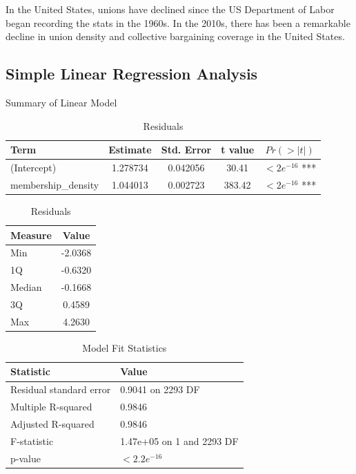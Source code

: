 \documentclass[11pt]{article}\usepackage[]{graphicx}\usepackage[]{xcolor}
\begin{document}
In the United States, unions have declined since the US Department of Labor began recording the stats in the 1960s. In the 2010s, there has been a remarkable decline in union density and collective bargaining coverage in the United States.

\subsection{Simple Linear Regression Analysis}
\begin{table}[ht]
\centering
\begin{minipage}[b]{0.48\linewidth}
\centering
\caption{Summary of Linear Model}
\begin{tabular}{@{}lcccc@{}}
\toprule
Term                & Estimate  & Std. Error & t value & $Pr(>|t|)$      \\ 
\midrule
(Intercept)         & 1.278734  & 0.042056   & 30.41   & $<2e^{-16}$ *** \\
membership\_density & 1.044013  & 0.002723   & 383.42  & $<2e^{-16}$ *** \\
\bottomrule
\end{tabular}
\label{tab:modelsummary}
\end{minipage}\hfill
\begin{minipage}[b]{0.48\linewidth}
\centering
\caption{Residuals}
\begin{tabular}{@{}lc@{}}
\toprule
Measure & Value      \\ 
\midrule
Min     & -2.0368    \\
1Q      & -0.6320    \\
Median  & -0.1668    \\
3Q      & 0.4589     \\
Max     & 4.2630     \\
\bottomrule
\end{tabular}
\label{tab:residuals}
\end{minipage}
\end{table}

\begin{table}[ht]
\centering
\caption{Model Fit Statistics}
\begin{tabular}{@{}ll@{}}
\toprule
Statistic                       & Value           \\
\midrule
Residual standard error         & 0.9041 on 2293 DF \\
Multiple R-squared              & 0.9846           \\
Adjusted R-squared              & 0.9846           \\
F-statistic                     & 1.47e+05 on 1 and 2293 DF \\
p-value                         & $<2.2e^{-16}$    \\
\bottomrule
\end{tabular}
\label{tab:modelfitstats}
\end{table}
\end{document}
